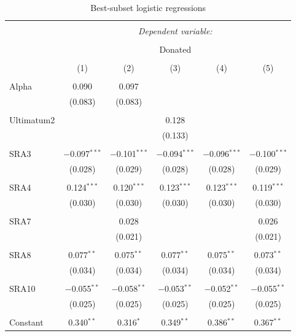 \documentclass[12pt]{article}
\begin{document}
\begin{table}[!htbp] \centering 
  \caption{Best-subset logistic regressions} 
  \label{} 
\begin{tabular}{@{\extracolsep{5pt}}lccccc} 
\\[-1.8ex]\hline 
\hline \\[-1.8ex] 
 & \multicolumn{5}{c}{\textit{Dependent variable:}} \\ 
\cline{2-6} 
\\[-1.8ex] & \multicolumn{5}{c}{Donated} \\ 
\\[-1.8ex] & (1) & (2) & (3) & (4) & (5)\\ 
\hline \\[-1.8ex] 
 Alpha & 0.090 & 0.097 &  &  &  \\ 
  & (0.083) & (0.083) &  &  &  \\ 
  & & & & & \\ 
 Ultimatum2 &  &  & 0.128 &  &  \\ 
  &  &  & (0.133) &  &  \\ 
  & & & & & \\ 
 SRA3 & $-$0.097$^{***}$ & $-$0.101$^{***}$ & $-$0.094$^{***}$ & $-$0.096$^{***}$ & $-$0.100$^{***}$ \\ 
  & (0.028) & (0.029) & (0.028) & (0.028) & (0.029) \\ 
  & & & & & \\ 
 SRA4 & 0.124$^{***}$ & 0.120$^{***}$ & 0.123$^{***}$ & 0.123$^{***}$ & 0.119$^{***}$ \\ 
  & (0.030) & (0.030) & (0.030) & (0.030) & (0.030) \\ 
  & & & & & \\ 
 SRA7 &  & 0.028 &  &  & 0.026 \\ 
  &  & (0.021) &  &  & (0.021) \\ 
  & & & & & \\ 
 SRA8 & 0.077$^{**}$ & 0.075$^{**}$ & 0.077$^{**}$ & 0.075$^{**}$ & 0.073$^{**}$ \\ 
  & (0.034) & (0.034) & (0.034) & (0.034) & (0.034) \\ 
  & & & & & \\ 
 SRA10 & $-$0.055$^{**}$ & $-$0.058$^{**}$ & $-$0.053$^{**}$ & $-$0.052$^{**}$ & $-$0.055$^{**}$ \\ 
  & (0.025) & (0.025) & (0.025) & (0.025) & (0.025) \\ 
  & & & & & \\ 
 Constant & 0.340$^{**}$ & 0.316$^{*}$ & 0.349$^{**}$ & 0.386$^{**}$ & 0.367$^{**}$ \\ 

\end{tabular}
\end{table}
\end{document}
